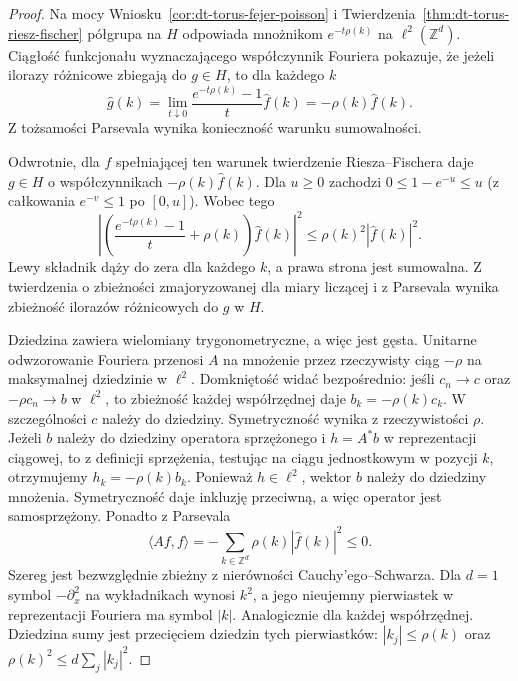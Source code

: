 \begin{proof}
Na mocy Wniosku~\ref{cor:dt-torus-fejer-poisson}
i Twierdzenia~\ref{thm:dt-torus-riesz-fischer}
półgrupa na $H$ odpowiada mnożnikom
$e^{-t\rho(k)}$ na $\ell^2(\mathbb Z^d)$.
Ciągłość funkcjonału wyznaczającego współczynnik
Fouriera pokazuje, że jeżeli ilorazy różnicowe
zbiegają do $g\in H$, to dla każdego $k$
\[
 \widehat g(k)=
 \lim_{t\downarrow0}\frac{e^{-t\rho(k)}-1}{t}
 \widehat f(k)=-\rho(k)\widehat f(k).
\]
Z tożsamości Parsevala wynika konieczność
warunku sumowalności.

Odwrotnie, dla $f$ spełniającej ten warunek
twierdzenie Riesza--Fischera daje $g\in H$
o współczynnikach $-\rho(k)\widehat f(k)$.
Dla $u\ge0$ zachodzi $0\le1-e^{-u}\le u$
(z całkowania $e^{-v}\le1$ po $[0,u]$).
Wobec tego
\[
 \left|
 \left(\frac{e^{-t\rho(k)}-1}{t}+\rho(k)\right)
 \widehat f(k)\right|^2
 \le \rho(k)^2|\widehat f(k)|^2.
\]
Lewy składnik dąży do zera dla każdego $k$,
a prawa strona jest sumowalna.
Z twierdzenia o zbieżności zmajoryzowanej
dla miary liczącej i z Parsevala wynika
zbieżność ilorazów różnicowych do $g$ w $H$.

Dziedzina zawiera wielomiany trygonometryczne,
a więc jest gęsta. Unitarne odwzorowanie Fouriera
przenosi $A$ na mnożenie przez rzeczywisty ciąg
$-\rho$ na maksymalnej dziedzinie w $\ell^2$.
Domkniętość widać bezpośrednio: jeśli $c_n\to c$
oraz $-\rho c_n\to b$ w $\ell^2$, to zbieżność
każdej współrzędnej daje $b_k=-\rho(k)c_k$.
W szczególności $c$ należy do dziedziny.
Symetryczność wynika z rzeczywistości $\rho$.
Jeżeli $b$ należy do dziedziny operatora
sprzężonego i $h=A^*b$ w reprezentacji ciągowej,
to z definicji sprzężenia, testując na ciągu
jednostkowym w pozycji $k$, otrzymujemy
$h_k=-\rho(k)b_k$. Ponieważ $h\in\ell^2$,
wektor $b$ należy do dziedziny mnożenia.
Symetryczność daje inkluzję przeciwną,
a więc operator jest samosprzężony.
Ponadto z Parsevala
\[
 \langle Af,f\rangle
 =-\sum_{k\in\mathbb Z^d}\rho(k)|\widehat f(k)|^2
 \le0.
\]
Szereg jest bezwzględnie zbieżny z nierówności
Cauchy'ego--Schwarza.
Dla $d=1$ symbol $-\partial_x^2$ na wykładnikach
wynosi $k^2$, a jego nieujemny pierwiastek
w reprezentacji Fouriera ma symbol $|k|$.
Analogicznie dla każdej współrzędnej.
Dziedzina sumy jest przecięciem dziedzin tych
pierwiastków: $|k_j|\le\rho(k)$ oraz
$\rho(k)^2\le d\sum_j|k_j|^2$.
\end{proof}

